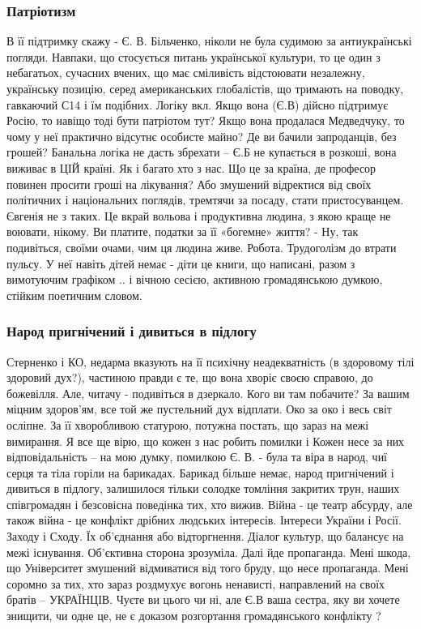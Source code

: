 \subsubsection{Патріотизм}

В її підтримку скажу - Є. В. Більченко, ніколи не була судимою за антиукраїнські
погляди. Навпаки, що стосується питань української культури, то це один з
небагатьох, сучасних вчених, що має сміливість відстоювати незалежну,
українську позицію, серед американських глобалістів, що тримають на поводку,
гавкаючий С14 і їм подібних. Логіку вкл. Якщо вона (Є.В) дійсно підтримує
Росію, то навіщо тоді бути патріотом тут? Якщо вона продалася Медведчуку, то
чому у неї практично відсутнє особисте майно? Де ви бачили запроданців, без
грошей? Банальна логіка не дасть збрехати – Є.Б не купається в розкоші, вона
виживає в ЦІЙ країні. Як і багато хто з нас. Що це за країна, де професор
повинен просити гроші на лікування? Або змушений відректися від своїх
політичних і національних поглядів, тремтячи за посаду, стати пристосуванцем.
Євгенія не з таких. Це вкрай вольова і продуктивна людина, з якою краще не
воювати, нікому. Ви платите, податки за її «богемне» життя? - Ну, так
подивіться, своїми очами, чим ця людина живе. Робота. Трудоголізм до втрати
пульсу. У неї навіть дітей немає - діти це книги, що написані, разом з
вимотуючим графіком .. і вічною сесією, активною громадянською думкою, стійким
поетичним словом.

\subsubsection{Народ пригнічений і дивиться в підлогу}

Стерненко і КО, недарма вказують на її психічну неадекватність (в здоровому
тілі здоровий дух?), частиною правди є те, що вона хворіє своєю справою, до
божевілля. Але, читачу - подивіться в дзеркало. Кого ви там побачите? За вашим
міцним здоров'ям, все той же пустельний дух відплати. Око за око і весь світ
осліпне. За її хворобливою статурою, потужна постать, що зараз на межі
вимирання. Я все ще вірю, що кожен з нас робить помилки і Кожен несе за них
відповідальність – на мою думку, помилкою Є. В. - була та віра в народ, чиї серця
та тіла горіли на барикадах. Барикад більше немає, народ пригнічений і дивиться
в підлогу, залишилося тільки солодке томління закритих трун, наших співгромадян
і безсовісна поведінка тих, хто вижив. Війна - це театр абсурду, але також
війна - це конфлікт дрібних людських інтересів. Інтереси України і Росії.
Заходу і Сходу. Їх об'єднання або відторгнення. Діалог культур, що балансує на
межі існування. Об'єктивна сторона зрозуміла. Далі йде пропаганда. Мені шкода,
що Університет змушений відмиватися від того бруду, що несе пропаганда. Мені
соромно за тих, хто зараз роздмухує вогонь ненависті, направлений на своїх
братів – УКРАЇНЦІВ. Чуєте ви цього чи ні, але Є.В ваша сестра, яку ви хочете
знищити, чи одне це, не є доказом розгортання громадянського конфлікту ? 

